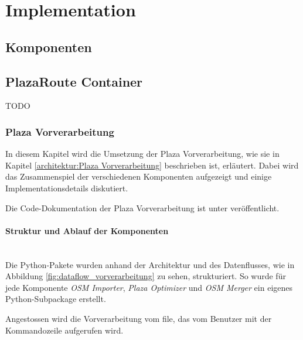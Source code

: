
\section{Implementation}
\label{sec:Implementation}

\subsection{Komponenten}
\label{impl:Komponenten}

\subsection{PlazaRoute Container}
\label{impl:PlazaRoute Container}
TODO

\subsubsection{Plaza Vorverarbeitung}
\label{impl:Plaza Vorverarbeitung}

In diesem Kapitel wird die Umsetzung der Plaza Vorverarbeitung, wie sie in Kapitel \ref{architektur:Plaza Vorverarbeitung} beschrieben ist, erläutert. Dabei wird das Zusammenspiel der verschiedenen Komponenten aufgezeigt und einige Implementationsdetails diskutiert.

Die Code-Dokumentation der Plaza Vorverarbeitung ist unter \cite{PlazaRoute-apidoc} veröffentlicht.

\paragraph{Struktur und Ablauf der Komponenten} \label{impl:Struktur der Komponenten} ~\\
Die Python-Pakete wurden anhand der Architektur und des Datenflusses, wie in Abbildung \ref{fig:dataflow_vorverarbeitung} zu sehen, strukturiert. So wurde für jede Komponente \emph{OSM Importer}, \emph{Plaza Optimizer} und \emph{OSM Merger} ein eigenes Python-Subpackage erstellt.

Angestossen wird die Vorverarbeitung vom  file, das vom Benutzer mit der Kommandozeile aufgerufen wird.

